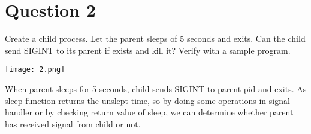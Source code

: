 \documentclass[main.tex]{subfiles}
\begin{document}
\section{Question 2}

Create a child process. Let the parent sleeps of 5 seconds and exits. Can the
child send SIGINT to its parent if exists and kill it? Verify with a sample
program.


\texttt{[image: 2.png]}

When parent sleeps for 5 seconds, child sends SIGINT to parent pid and exits. As
sleep function returns the unslept time, so by doing some operations in signal
handler or by checking return value of sleep, we can determine whether parent has
received signal from child or not.

\clearpage
\end{document}
